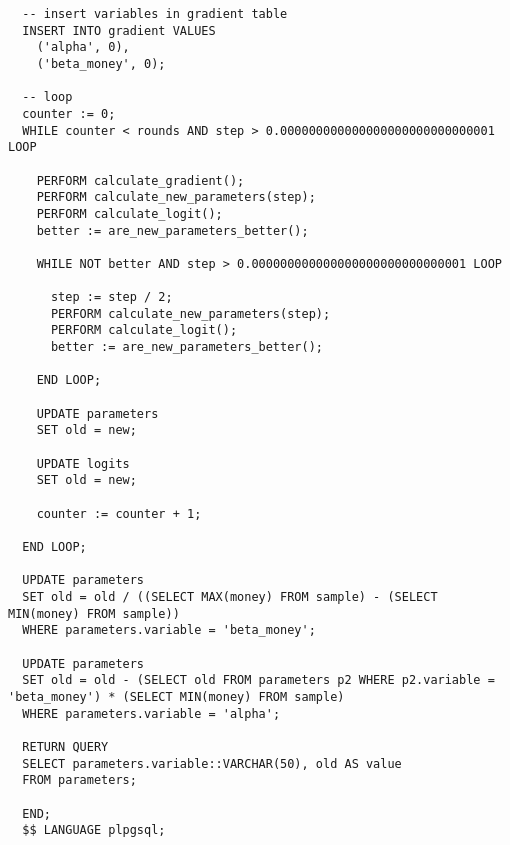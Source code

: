 \begin{verbatim}
  -- insert variables in gradient table
  INSERT INTO gradient VALUES
    ('alpha', 0),
    ('beta_money', 0);

  -- loop
  counter := 0;
  WHILE counter < rounds AND step > 0.000000000000000000000000000001 LOOP

    PERFORM calculate_gradient();
    PERFORM calculate_new_parameters(step);
    PERFORM calculate_logit();
    better := are_new_parameters_better();

    WHILE NOT better AND step > 0.000000000000000000000000000001 LOOP

      step := step / 2;
      PERFORM calculate_new_parameters(step);
      PERFORM calculate_logit();
      better := are_new_parameters_better();

    END LOOP;

    UPDATE parameters
    SET old = new;

    UPDATE logits
    SET old = new;

    counter := counter + 1;

  END LOOP;

  UPDATE parameters
  SET old = old / ((SELECT MAX(money) FROM sample) - (SELECT MIN(money) FROM sample))
  WHERE parameters.variable = 'beta_money';

  UPDATE parameters
  SET old = old - (SELECT old FROM parameters p2 WHERE p2.variable = 'beta_money') * (SELECT MIN(money) FROM sample)
  WHERE parameters.variable = 'alpha';

  RETURN QUERY
  SELECT parameters.variable::VARCHAR(50), old AS value
  FROM parameters;

  END;
  $$ LANGUAGE plpgsql;
\end{verbatim}
